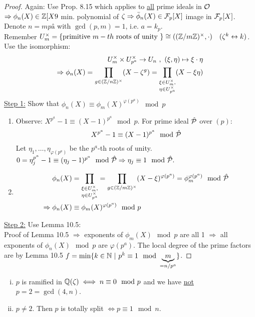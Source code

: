 \begin{proof}
Again: Use Prop. 8.15 which applies to \underline{all} prime ideals in $\mathcal{O}$\\
$\Rightarrow \phi_n(X) \in \mathbb{Z}[X9$ min. polynomial of $\zeta \Rightarrow \bar{\phi}_n(X) \in \mathcal{F}_p[X]$ image in $\mathcal{F}_p[X]$.\\
Denote $n=mpâ$ with $\gcd(p,m)=1$, i.e. $a=k_p$.\\
Remember $U_m^\times=\{\text{primitive } m-th \text{ roots of unity }\} \cong ((\mathbb{Z}/m\mathbb{Z})^\times, \cdot) \quad (\zeta^k\leftrightarrow k)$.\\
Use the isomorphism:
\begin{align*}
U_m^\times \times U_{p^a}^\times \to U_n \ , \ (\xi, \eta) \mapsto \xi \cdot \eta\\
\Rightarrow \phi_n(X)=\prod_{g \in (\mathbb{Z}/n\mathbb{Z})^\times} (X -\zeta^g) = \prod_{\substack{\xi \in U_m^\times,\\ \eta \in U_{p^a}^\times}} (X -\xi \eta)
\end{align*}
\underline{Step 1:} Show that $\phi_n(X) \equiv \phi_m(X)^{\varphi(p^a)} \mod p$
\begin{enumerate}[(1)]
\item Observe: $X^{p^a}-1 \equiv (X-1)^{p^a} \mod p$. For prime ideal $\hat{\mathcal{P}}$ over $(p)$:
\[X^{p^a}-1 \equiv (X-1)^{p^a} \mod {\hat{\mathcal{P}}}\]
Let $\eta_1, \dots, \eta_{\varphi(p^a)}$ be the $p^a$-th roots of unity.\\
$0=\eta_j^{p^a}-1 \equiv (\eta_j-1)^{p^a}\mod {\hat{\mathcal{P}}} \Rightarrow \eta_j \equiv 1 \mod {\hat{\mathcal{P}}}.$
\item \begin{align*}
\phi_n(X)&=\prod_{\substack{\xi \in U_m^\times,\\ \eta \in U_{p^a}^\times}}=\prod_{g \in (\mathbb{Z}/m\mathbb{Z})^\times} (X -\xi)^{\varphi(p^a)} = \phi_m^{\varphi(p^a)} \mod {\hat{\mathcal{P}}}\\
\Rightarrow \phi_n(X) &\equiv \phi_m(X)^{\varphi(p^a)} \mod p
\end{align*}
\end{enumerate}
\underline{Step 2:} Use Lemma 10.5:\\
Proof of Lemma 10.5 $\Rightarrow$ exponents of $\phi_m(X) \mod p$ are all 1 $\Rightarrow$ all exponents of $\phi_n(X) \mod p$ are $\varphi(p^a)$. The local degree of the prime factors are by Lemma 10.5 \linebreak $f=\min\{k \in \mathbb{N} \ | \ p^k \equiv 1 \mod \underbrace{m}_{=n/p^a}\}$.
\end{proof}

\begin{Kor}
\begin{enumerate}[i)]
\item $p$ is ramified in $\mathbb{Q}(\zeta) \iff n \equiv 0 \mod p$ and we have \underline{not} $p=2=\gcd(4,n)$.
\item $p \neq 2$. Then $p$ is totally split $\iff p \equiv 1 \mod n$.
\end{enumerate}
\end{Kor}


